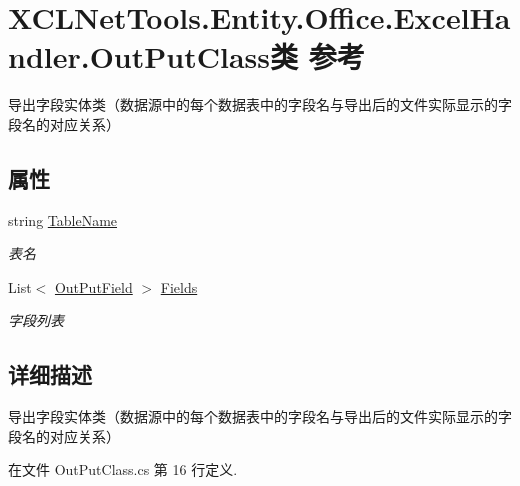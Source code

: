\hypertarget{class_x_c_l_net_tools_1_1_entity_1_1_office_1_1_excel_handler_1_1_out_put_class}{}\section{X\+C\+L\+Net\+Tools.\+Entity.\+Office.\+Excel\+Handler.\+Out\+Put\+Class类 参考}
\label{class_x_c_l_net_tools_1_1_entity_1_1_office_1_1_excel_handler_1_1_out_put_class}


导出字段实体类（数据源中的每个数据表中的字段名与导出后的文件实际显示的字段名的对应关系）  


\subsection*{属性}
\begin{DoxyCompactItemize}
\item 
string \hyperlink{class_x_c_l_net_tools_1_1_entity_1_1_office_1_1_excel_handler_1_1_out_put_class_afdbc40e9ef162503cbf1ebea55728c59}{Table\+Name}
\begin{DoxyCompactList}\small\item\em 表名 \end{DoxyCompactList}\item 
List$<$ \hyperlink{class_x_c_l_net_tools_1_1_entity_1_1_office_1_1_excel_handler_1_1_out_put_field}{Out\+Put\+Field} $>$ \hyperlink{class_x_c_l_net_tools_1_1_entity_1_1_office_1_1_excel_handler_1_1_out_put_class_a3efddb66ca15bab7aa2b15f80d59fa06}{Fields}
\begin{DoxyCompactList}\small\item\em 字段列表 \end{DoxyCompactList}\end{DoxyCompactItemize}


\subsection{详细描述}
导出字段实体类（数据源中的每个数据表中的字段名与导出后的文件实际显示的字段名的对应关系） 



在文件 Out\+Put\+Class.\+cs 第 16 行定义.



